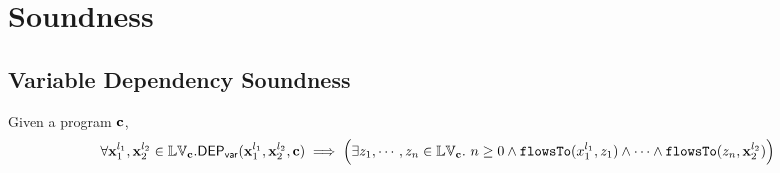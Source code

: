 \section{Soundness}


\subsection{Variable Dependency Soundness}
\begin{thm}
Given a program ${\boldsymbol{\mathbf{c}}}$, 
\[
  \forall {\boldsymbol{\mathbf{x}}}_1^{l_1}, {\boldsymbol{\mathbf{x}}}_2^{l_2} \in \mathbb{LV}_{{\boldsymbol{\mathbf{c}}}}.
  \mathsf{DEP_{var}}({\boldsymbol{\mathbf{x}}}_1^{l_1}, {\boldsymbol{\mathbf{x}}}_2^{l_2}, {\boldsymbol{\mathbf{c}}})
  \implies 
  \Big( \exists z_1, \cdots, z_n \in \mathbb{LV}_{{\boldsymbol{\mathbf{c}}}}. ~ n \geq 0 \land
  \mathtt{flowsTo}(x_1^{l_1}, z_1) 
  \land \cdots \land \mathtt{flowsTo}(z_n, {\boldsymbol{\mathbf{x}}}_2^{l_2}) \Big)
\]
\end{thm}
